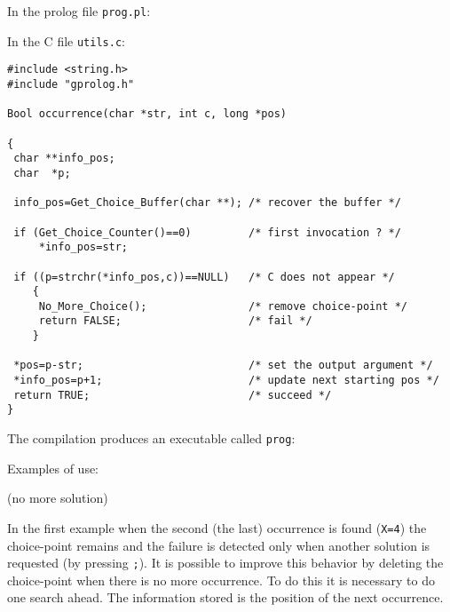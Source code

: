 In the prolog file \texttt{prog.pl}:


In the C file \texttt{utils.c}:

\begin{Indentation}
\begin{verbatim}
#include <string.h>
#include "gprolog.h"

Bool occurrence(char *str, int c, long *pos)

{
 char **info_pos;
 char  *p;

 info_pos=Get_Choice_Buffer(char **); /* recover the buffer */

 if (Get_Choice_Counter()==0)         /* first invocation ? */
     *info_pos=str;

 if ((p=strchr(*info_pos,c))==NULL)   /* C does not appear */
    {
     No_More_Choice();                /* remove choice-point */
     return FALSE;                    /* fail */
    }

 *pos=p-str;                          /* set the output argument */
 *info_pos=p+1;                       /* update next starting pos */
 return TRUE;                         /* succeed */
}
\end{verbatim}
\end{Indentation}

The compilation produces an executable called \texttt{prog}:


Examples of use:


\begin{CodeTwoCols}
\SkipLine
{}
\SkipLine
{}
\SkipLine
{}     {(no more solution)}
\SkipLine
{}
\SkipLine
{}
\end{CodeTwoCols}

In the first example when the second (the last) occurrence is found
(\texttt{X=4}) the choice-point remains and the failure is detected only
when another solution is requested (by pressing \texttt{;}). It is possible
to improve this behavior by deleting the choice-point when there is no more
occurrence. To do this it is necessary to do one search ahead. The
information stored is the position of the next occurrence.


